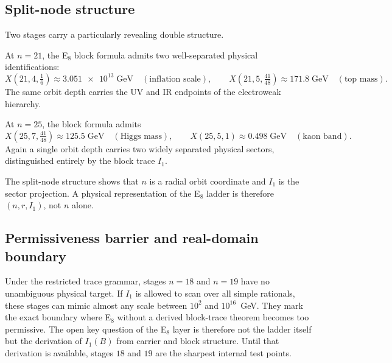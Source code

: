 \subsection{Split-node structure}

Two stages carry a particularly revealing double structure.

\begin{proposition}
At $n=21$, the E$_8$ block formula admits two well-separated physical identifications:
\[
X(21,4,\tfrac16)\approx\num{3.051e13}\;\mathrm{GeV}\quad(\text{inflation scale}),
\qquad
X(21,5,\tfrac{41}{48})\approx\num{171.8}\;\mathrm{GeV}\quad(\text{top mass}).
\]
The same orbit depth carries the UV and IR endpoints of the electroweak hierarchy.
\end{proposition}

\begin{proposition}
At $n=25$, the block formula admits
\[
X(25,7,\tfrac{41}{48})\approx\num{125.5}\;\mathrm{GeV}\quad(\text{Higgs mass}),
\qquad
X(25,5,1)\approx\num{0.498}\;\mathrm{GeV}\quad(\text{kaon band}).
\]
Again a single orbit depth carries two widely separated physical sectors, distinguished entirely by the block trace $I_1$.
\end{proposition}

The split-node structure shows that $n$ is a radial orbit coordinate and $I_1$ is the sector projection. A physical representation of the E$_8$ ladder is therefore $(n,r,I_1)$, not $n$ alone.

\subsection{Permissiveness barrier and real-domain boundary}

\begin{remark}[Permissiveness barrier at $n=18{,}19$]
Under the restricted trace grammar, stages $n=18$ and $n=19$ have no unambiguous physical target. If $I_1$ is allowed to scan over all simple rationals, these stages can mimic almost any scale between $10^2$ and $10^{16}$~GeV. They mark the exact boundary where E$_8$ without a derived block-trace theorem becomes too permissive. The open key question of the E$_8$ layer is therefore not the ladder itself but the derivation of $I_1(B)$ from carrier and block structure. Until that derivation is available, stages $18$ and $19$ are the sharpest internal test points.
\end{remark}

